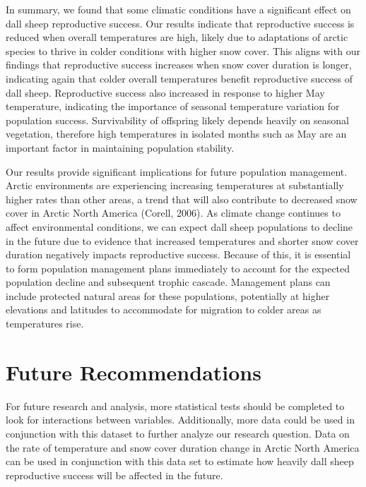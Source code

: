 \documentclass[
  12pt,
]{article}
\begin{document}
In summary, we found that some climatic conditions have a significant
effect on dall sheep reproductive success. Our results indicate that
reproductive success is reduced when overall temperatures are high,
likely due to adaptations of arctic species to thrive in colder
conditions with higher snow cover. This aligns with our findings that
reproductive success increases when snow cover duration is longer,
indicating again that colder overall temperatures benefit reproductive
success of dall sheep. Reproductive success also increased in response
to higher May temperature, indicating the importance of seasonal
temperature variation for population success. Survivability of offspring
likely depends heavily on seasonal vegetation, therefore high
temperatures in isolated months such as May are an important factor in
maintaining population stability.

Our results provide significant implications for future population
management. Arctic environments are experiencing increasing temperatures
at substantially higher rates than other areas, a trend that will also
contribute to decreased snow cover in Arctic North America (Corell,
2006). As climate change continues to affect environmental conditions,
we can expect dall sheep populations to decline in the future due to
evidence that increased temperatures and shorter snow cover duration
negatively impacts reproductive success. Because of this, it is
essential to form population management plans immediately to account for
the expected population decline and subsequent trophic cascade.
Management plans can include protected natural areas for these
populations, potentially at higher elevations and latitudes to
accommodate for migration to colder areas as temperatures rise.

\hypertarget{future-recommendations}{%
\section{Future Recommendations}\label{future-recommendations}}

For future research and analysis, more statistical tests should be
completed to look for interactions between variables. Additionally, more
data could be used in conjunction with this dataset to further analyze
our research question. Data on the rate of temperature and snow cover
duration change in Arctic North America can be used in conjunction with
this data set to estimate how heavily dall sheep reproductive success
will be affected in the future.
\end{document}
